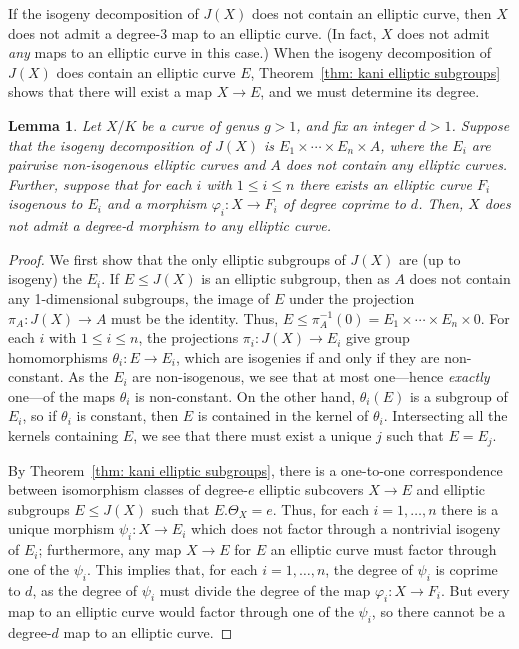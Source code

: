 \documentclass[12pt]{amsart}
\newtheorem{lem}[thm]{Lemma}
\theoremstyle{definition}
\renewcommand{\phi}{\varphi}
\numberwithin{equation}{section}
\begin{document}
If the isogeny decomposition of $J(X)$ does not contain an elliptic curve, then $X$ does not admit a degree-$3$ map to an elliptic curve. (In fact, $X$ does not admit \emph{any} maps to an elliptic curve in this case.) When the isogeny decomposition of $J(X)$ does contain an elliptic curve $E$, Theorem~\ref{thm: kani elliptic subgroups} shows that there will exist a map $X \to E$, and we must determine its degree.

\begin{lem}\label{lem:distinct elliptic factors of jacobian}
    Let $X/K$ be a curve of genus $g > 1$, and fix an integer $d > 1$. Suppose that the isogeny decomposition of $J(X)$ is  $E_1 \times \cdots \times E_n \times A$, where the $E_i$ are pairwise non-isogenous elliptic curves and $A$ does not contain any elliptic curves. Further, suppose that for each $i$ with $1\le i\le n$ there exists an elliptic curve $F_i$ isogenous to $E_i$ and a morphism $\varphi_i: X \to F_i$ of degree coprime to $d$. Then, $X$ does not admit a degree-$d$ morphism to any elliptic curve.
\end{lem}

\begin{proof}
    We first show that the only elliptic subgroups of $J(X)$ are (up to isogeny) the $E_i$. If $E \leq J(X)$ is an elliptic subgroup, then as $A$ does not contain any 1-dimensional subgroups, the image of $E$ under the projection $\pi_A: J(X) \to A$ must be the identity. Thus, $E \leq \pi^{-1}_A(0) = E_1 \times \cdots \times E_n \times 0$. For each $i$ with $1 \le i\le n$, the projections $\pi_i: J(X) \to E_i$ give group homomorphisms $\theta_i: E \to E_i$, which are isogenies if and only if they are non-constant. As the $E_i$ are non-isogenous, we see that at most one---hence \emph{exactly} one---of the maps $\theta_i$ is non-constant. On the other hand, $\theta_i(E)$ is a subgroup of $E_i$, so if $\theta_i$ is constant, then $E$ is contained in the kernel of $\theta_i$. Intersecting all the kernels containing $E$, we see that there must exist a unique $j$ such that $E = E_j$.
    
    By Theorem~\ref{thm: kani elliptic subgroups}, there is a one-to-one correspondence between isomorphism classes of degree-$e$ elliptic subcovers $X \to E$ and elliptic subgroups $E \leq J(X)$ such that $E . \Theta_X = e$. Thus, for each $i = 1,\ldots,n$ there is a unique morphism $\psi_i : X \to E_i$ which does not factor through a nontrivial isogeny of $E_i$; furthermore, any map $X \to E$ for $E$ an elliptic curve must factor through one of the $\psi_i$. This implies that, for each $i = 1,\ldots,n$, the degree of $\psi_i$ is coprime to $d$, as the degree of $\psi_i$ must divide the degree of the map $\phi_i : X \to F_i$. But every map to an elliptic curve would factor through one of the $\psi_i$, so there cannot be a degree-$d$ map to an elliptic curve.
\end{proof}
\end{document}
